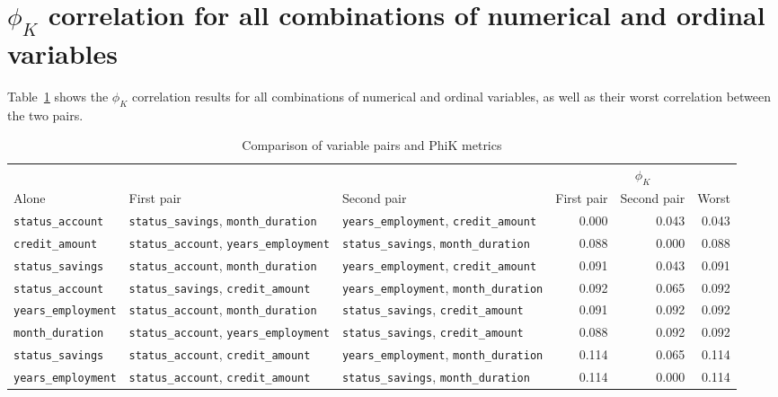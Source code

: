 \documentclass{ieeeaccess}
\begin{document}
\section{$\phi_{K}$ correlation for all combinations of numerical and ordinal variables}
\label{ap:phik_numerical_ordinal}

Table~\ref{tab:phik_numerical_ordinal} shows the $\phi_{K}$ correlation results for all combinations of numerical and ordinal variables, as well as their worst correlation between the two pairs.

\begin{table}[htbp]
  \caption{Comparison of variable pairs and PhiK metrics}
  \label{tab:phik_numerical_ordinal}
  \centering
  \setlength{\tabcolsep}{4pt}
  \begin{tabular}{@{}lllrrr@{}}
    \toprule
    & & & \multicolumn{3}{c}{$\phi_K$} \\
    \cmidrule(l){4-6}
    Alone & First pair & Second pair & First pair & Second pair & Worst \\
    \midrule
    \texttt{status\_account} & \texttt{status\_savings}, \texttt{month\_duration} & \texttt{years\_employment}, \texttt{credit\_amount} & 0.000 & 0.043 & 0.043 \\
    \texttt{credit\_amount} & \texttt{status\_account}, \texttt{years\_employment} & \texttt{status\_savings}, \texttt{month\_duration} & 0.088 & 0.000 & 0.088 \\
    \texttt{status\_savings} & \texttt{status\_account}, \texttt{month\_duration} & \texttt{years\_employment}, \texttt{credit\_amount} & 0.091 & 0.043 & 0.091 \\
    \texttt{status\_account} & \texttt{status\_savings}, \texttt{credit\_amount} & \texttt{years\_employment}, \texttt{month\_duration} & 0.092 & 0.065 & 0.092 \\
    \texttt{years\_employment} & \texttt{status\_account}, \texttt{month\_duration} & \texttt{status\_savings}, \texttt{credit\_amount} & 0.091 & 0.092 & 0.092 \\
    \texttt{month\_duration} & \texttt{status\_account}, \texttt{years\_employment} & \texttt{status\_savings}, \texttt{credit\_amount} & 0.088 & 0.092 & 0.092 \\
    \texttt{status\_savings} & \texttt{status\_account}, \texttt{credit\_amount} & \texttt{years\_employment}, \texttt{month\_duration} & 0.114 & 0.065 & 0.114 \\
    \texttt{years\_employment} & \texttt{status\_account}, \texttt{credit\_amount} & \texttt{status\_savings}, \texttt{month\_duration} & 0.114 & 0.000 & 0.114 \\

\end{tabular}
\end{table}
\end{document}
